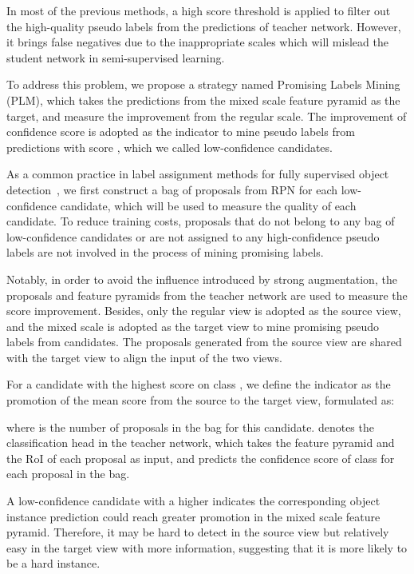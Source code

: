 \documentclass[10pt,twocolumn,letterpaper]{article}
\begin{document}
In most of the previous methods, a high score threshold  is applied to filter out the high-quality pseudo labels from the predictions of teacher network. However, it brings false negatives due to the inappropriate scales which will mislead the student network in semi-supervised learning.

To address this problem, we propose a strategy named Promising Labels Mining (PLM), which takes the predictions from the mixed scale feature pyramid as the target, and measure the improvement from the regular scale. The improvement of confidence score is adopted as the indicator to mine pseudo labels from predictions with score , which we called low-confidence candidates.



As a common practice in label assignment methods for fully supervised object detection~\cite{tood, ota, MutualSup, fcos, dwla}, we first construct a bag of proposals from RPN for each low-confidence candidate, which will be used to measure the quality of each candidate. To reduce training costs, proposals that do not belong to any bag of low-confidence candidates or are not assigned to any high-confidence pseudo labels are not involved in the process of mining promising labels.

Notably, in order to avoid the influence introduced by strong augmentation, the proposals and feature pyramids from the teacher network are used to measure the score improvement. Besides, only the regular view is adopted as the source view, and the mixed scale is adopted as the target view to mine promising pseudo labels from candidates. The proposals generated from the source view are shared with the target view to align the input of the two views.

For a candidate with the highest score on class , we define the indicator  as the promotion of the mean score from the source to the target view, formulated as:

where  is the number of proposals in the bag for this candidate.  denotes the classification head in the teacher network, which takes the feature pyramid  and the RoI of each proposal  as input, and predicts the confidence score of class  for each proposal in the bag. 

A low-confidence candidate with a higher  indicates the corresponding object instance prediction could reach greater promotion in the mixed scale feature pyramid. Therefore, it may be hard to detect in the source view but relatively easy in the target view with more information, suggesting that it is more likely to be a hard instance. 
\end{document}
